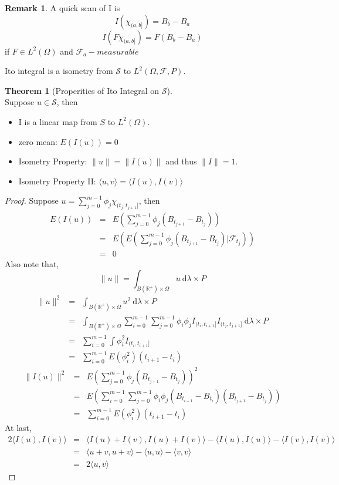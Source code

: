 \documentclass[12pt]{book}
\theoremstyle{definition}
\newtheorem{theorem}{Theorem}[chapter]
\newtheorem{remark}{Remark}
\newcommand{\inner}[2]{{\langle #1,#2\rangle}}
\newcommand{\R}{\mathbb{R}}
\newcommand{\D}{\mathrm{d}}
\begin{document}
\begin{remark}
A quick scan of I is 
$$
I(\chi_{(a,b]}) = B_b - B_a 
$$
$$
I(F\chi_{(a,b]}) = F(B_b-B_a)
$$
if $F \in L^2(\Omega)$ and $\mathcal{F}_a-measurable$ 
\end{remark}

Ito integral is a isometry from $\mathcal S$ to $L^2(\Omega,\mathcal{F},P)$.

\begin{theorem}[Properities of Ito Integral on $\mathcal S$] \ \\
Suppose $u\in \mathcal S$, then
\begin{itemize}
	\item I is a linear map from $S$ to $L^2(\Omega)$.
	\item zero mean: $E(I(u))=0$
	\item Isometry Property: $\| u\| = \| I(u)\|$ and thus $\| I\|=1$.
	\item Isometry Property II: $\inner{u}{v}=\inner{I(u)}{I(v)}$
\end{itemize}
\begin{proof}
Suppose $u = \sum_{j=0}^{m-1}\phi_j \chi_{(t_j,t_{j+1}]}$, then 
\begin{eqnarray*}
E(I(u))&=&E(\sum_{j=0}^{m-1} \phi_j(B_{t_{j+1}}-B_{t_j})) \\
&=&E(E(\sum_{j=0}^{m-1} \phi_j(B_{t_{j+1}}-B_{t_j})|\mathcal{F}_{t_j})) \\
&=&0
\end{eqnarray*}
Also note that, 
$$
\| u \| = \int_{B(\R^+)\times \Omega} u \ \D \lambda \times P
$$
\begin{eqnarray*}
	\| u \|^2 &=& \int_{B(\R^+)\times \Omega} u^2 \ \D \lambda \times P \\
&=& \int_{B(\R^+)\times \Omega} \sum_{i=0}^{m-1}\sum_{j=0}^{m-1}\phi_i \phi_j I_{(t_i,t_{i+1}]}I_{(t_j,t_{j+1}]} \ \D \lambda \times P \\
&=& \sum_{i=0}^{m-1}\int \phi_i^2 I_{(t_i,t_{i+1}]} \\
&=& \sum_{i=0}^{m-1} E(\phi_i^2)(t_{i+1}-t_i)
\end{eqnarray*}
\begin{eqnarray*}
\| I(u) \|^2 &=& E(\sum_{j=0}^{m-1} \phi_j(B_{t_{j+1}}-B_{t_j}))^2 \\
&=& E(\sum_{i=0}^{m-1}\sum_{j=0}^{m-1}\phi_i\phi_j(B_{t_{i+1}}-B_{t_i})(B_{t_{j+1}}-B_{t_j})) \\
&=& \sum_{i=0}^{m-1} E(\phi_i^2)(t_{i+1}-t_i)
\end{eqnarray*}
At last, 
\begin{eqnarray*}
	2\inner{I(u)}{I(v)} &=& \inner{I(u)+I(v)}{I(u)+I(v)}-\inner{I(u)}{I(u)}-\inner{I(v)}{I(v)} \\
	&=& \inner{u+v}{u+v}-\inner{u}{u}-\inner{v}{v} \\
	&=& 2\inner{u}{v}
\end{eqnarray*}
\end{proof}
\end{theorem}
\end{document}

